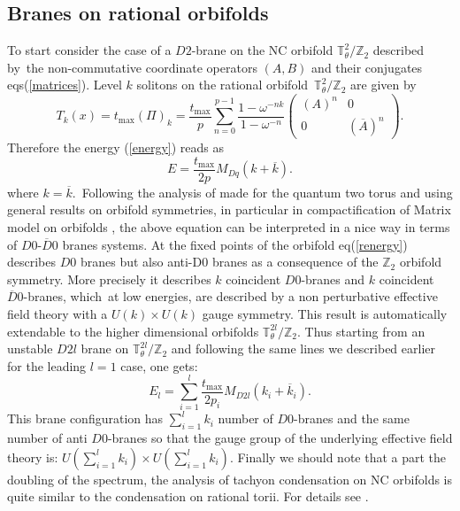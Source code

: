 \documentclass[a4paper,12pt]{article}
\begin{document}
\subsection{Branes on rational orbifolds}

To start consider the case of a $D2$-brane on the NC orbifold $%
\mathbb{T}_{\theta }^{2}/\mathbb{Z}_{2}$ described by\ the non-commutative
coordinate operators $(A,B)$ and their conjugates eqs(\ref{matrices}). Level $k$ solitons
on the rational orbifold\ $\mathbb{T}_{\theta }^{2}/\mathbb{Z}_{2}$ are
given by
\begin{equation}\label{rtsolution}
T_{k}(x)=t_{\text{max}}(\Pi )_{k}=\frac{t_{\text{max}}}{p}\sum_{n=0}^{p-1}%
\frac{1-\omega ^{-nk}}{1-\omega ^{-n}}\left(
\begin{array}{cc}
(A)^{n} & 0 \\
0 & (\overline{A})^{n}
\end{array}
\right) .
\end{equation}
Therefore the energy (\ref{energy}) reads as
\begin{equation}\label{renergy}
E=\frac{t_{\text{max}}}{2p}M_{Dq}(k+\overline{k}).
\end{equation}
where $k=\overline{k}$.\ Following the analysis of \cite{g} made
for the quantum two torus and using general results on orbifold
symmetries, in particular in compactification of Matrix model on
orbifolds \cite{k}, the above equation can be interpreted in a
nice way in terms of $D0$-$\overline{D}0$ branes systems. At the
fixed points of the orbifold eq(\ref{renergy}) describes $D0$
branes but also anti-D0 branes as a consequence of the
$\mathbb{Z}_{2}$ orbifold symmetry. More precisely it describes
$k$ coincident $D0$-branes and $k$ coincident
$\overline{D}0$-branes, which\ at low energies, are described by a
non perturbative effective field theory with a $U(k)\times U(k)$
gauge symmetry. This result is automatically extendable to the
higher dimensional orbifolds $\mathbb{T}_{\theta
}^{2l}/\mathbb{Z}_{2}$. Thus
starting from an unstable $D2l$ brane on $\mathbb{T}_{\theta }^{2l}/\mathbb{Z%
}_{2}$ and following the same lines we described earlier for the leading $%
l=1$ case, one gets:
\begin{equation}
E_{l}=\sum_{i=1}^{l}\frac{t_{\text{max}}}{2p_{i}}M_{D2l}(k_{i}+\overline{k}%
_{i}).
\end{equation}
This brane configuration has $\sum_{i=1}^{l}k_{i}$ number of $D0$-branes and
the same number of anti $D0$-branes so that the gauge group of the
underlying effective field theory is: $U(\sum_{i=1}^{l}k_{i})\times
U(\sum_{i=1}^{l}k_{i})$. Finally we should note that a part the doubling of
the spectrum, the analysis of tachyon condensation on NC
orbifolds is quite similar to the condensation on rational torii. For
details see \cite{j}.
\end{document}
